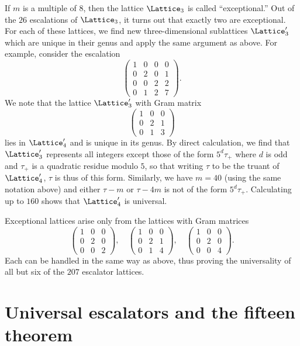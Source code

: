 If \(m\) is a multiple of \(8\), then the lattice \(\Lattice_3\) is called
``exceptional.'' Out of the \(26\) escalations of \(\Lattice_3\), it turns out
that exactly two are exceptional. For each of these lattices, we find new
three-dimensional sublattices \(\Lattice_3'\) which are unique in their genus
and apply the same argument as above. For example, consider the escalation
\[
    \begin{pmatrix}
        1 & 0 & 0 & 0 \\
        0 & 2 & 0 & 1 \\
        0 & 0 & 2 & 2 \\
        0 & 1 & 2 & 7
    \end{pmatrix}.
\]
We note that the lattice \(\Lattice_3'\) with Gram matrix
\[
    \begin{pmatrix}
        1 & 0 & 0 \\
        0 & 2 & 1 \\
        0 & 1 & 3
    \end{pmatrix}
\]
lies in \(\Lattice'_4\) and is unique in its genus. By direct calculation, we
find that \(\Lattice_3'\) represents all integers except those of the form
\(5^d\tau_{+}\) where \(d\) is odd and \(\tau_{+}\) is a quadratic residue
modulo \(5\), so that writing \(\tau\) to be the truant of \(\Lattice_4'\),
\(\tau\) is thus of this form. Similarly, we have \(m = 40\) (using the same
notation above) and either \(\tau - m\) or \(\tau - 4m\) is not of the form
\(5^d\tau_{+}\). Calculating up to \(160\) shows that \(\Lattice_4'\) is
universal. 

Exceptional lattices arise only from the lattices with Gram matrices
\[
    \begin{pmatrix}
        1 & 0 & 0 \\
        0 & 2 & 0 \\
        0 & 0 & 2
    \end{pmatrix}, \quad
    \begin{pmatrix}
        1 & 0 & 0 \\
        0 & 2 & 1 \\
        0 & 1 & 4
    \end{pmatrix}, \quad
    \begin{pmatrix}
        1 & 0 & 0 \\
        0 & 2 & 0 \\
        0 & 0 & 4
    \end{pmatrix}.
\]
Each can be handled in the same way as above, thus proving the universality of
all but six of the \(207\) escalator lattices.


\section{Universal escalators and the fifteen theorem}